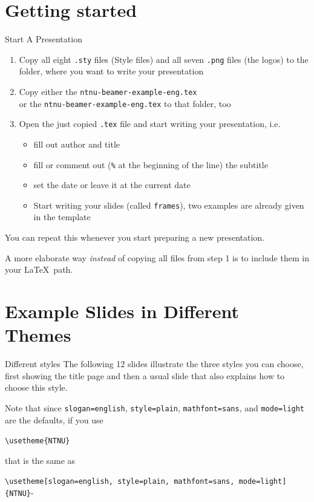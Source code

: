 \documentclass[aspectratio=169]{beamer}
\begin{document}
	\section{Getting started}
		\begin{frame}[fragile]{Start A Presentation}
			\label{slide:start}
			\begin{enumerate}
				\item Copy all eight \lstinline!.sty! files (Style files) and all seven \lstinline!.png! files (the logos) to the folder, where you want to write your presentation
				\item Copy \alert{either} the \lstinline!ntnu-beamer-example-eng.tex!\\
				\alert{or} the \lstinline!ntnu-beamer-example-eng.tex! to that folder, too
				\item Open the just copied \lstinline!.tex! file and start writing your presentation, i.e.
				\begin{itemize}
					\item fill out author and title
					\item fill or comment out (\lstinline!%! at the beginning of the line) the subtitle
					\item set the date or leave it at the current date
					\item Start writing your slides (called \lstinline!frames!), two examples are already given in the template
				\end{itemize}
			\end{enumerate}
			You can repeat this whenever you start preparing a new presentation.

			A more elaborate way \emph{instead} of copying all files from step 1 is to
			include them in your \LaTeX\ path.
		\end{frame}
	\section{Example Slides in Different Themes}
	\begin{frame}[fragile]{Different styles}
		\label{slide:styles-demo}
		The following 12 slides illustrate the three styles you can choose,
		first showing the title page and then a usual slide that also explains how to choose this style.

		Note that since \lstinline!slogan=english!, \lstinline!style=plain!, \lstinline!mathfont=sans!, and \lstinline!mode=light! are the defaults, if you use

		\lstinline!\usetheme{NTNU}!

		that is the same as

		\lstinline!\usetheme[slogan=english, style=plain, mathfont=sans, mode=light]{NTNU}!-
	\end{frame}
	{
		
		
		
		
		
		
	}
\end{document}

